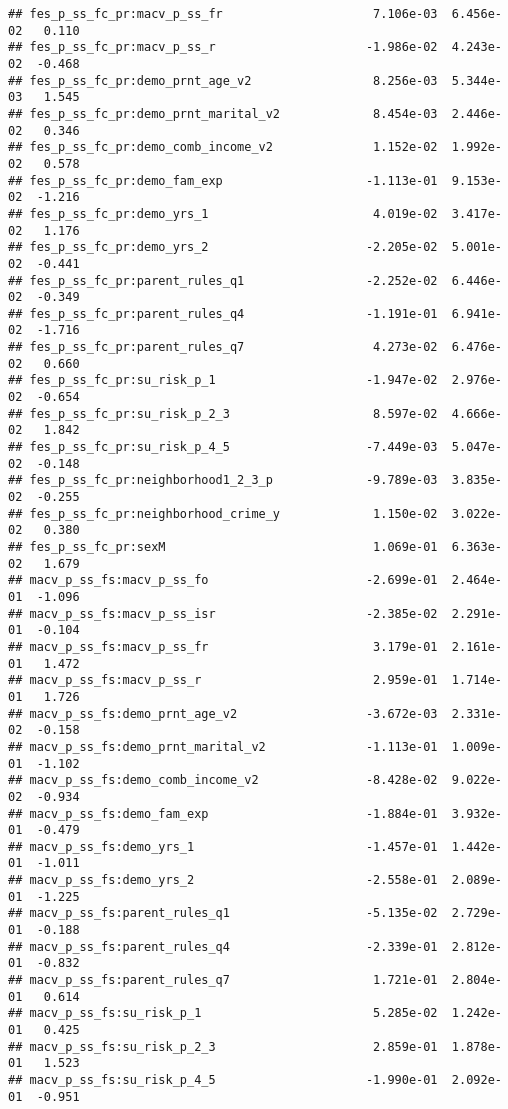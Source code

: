 \documentclass[
]{article}
\begin{document}
\begin{verbatim}
## fes_p_ss_fc_pr:macv_p_ss_fr                     7.106e-03  6.456e-02   0.110
## fes_p_ss_fc_pr:macv_p_ss_r                     -1.986e-02  4.243e-02  -0.468
## fes_p_ss_fc_pr:demo_prnt_age_v2                 8.256e-03  5.344e-03   1.545
## fes_p_ss_fc_pr:demo_prnt_marital_v2             8.454e-03  2.446e-02   0.346
## fes_p_ss_fc_pr:demo_comb_income_v2              1.152e-02  1.992e-02   0.578
## fes_p_ss_fc_pr:demo_fam_exp                    -1.113e-01  9.153e-02  -1.216
## fes_p_ss_fc_pr:demo_yrs_1                       4.019e-02  3.417e-02   1.176
## fes_p_ss_fc_pr:demo_yrs_2                      -2.205e-02  5.001e-02  -0.441
## fes_p_ss_fc_pr:parent_rules_q1                 -2.252e-02  6.446e-02  -0.349
## fes_p_ss_fc_pr:parent_rules_q4                 -1.191e-01  6.941e-02  -1.716
## fes_p_ss_fc_pr:parent_rules_q7                  4.273e-02  6.476e-02   0.660
## fes_p_ss_fc_pr:su_risk_p_1                     -1.947e-02  2.976e-02  -0.654
## fes_p_ss_fc_pr:su_risk_p_2_3                    8.597e-02  4.666e-02   1.842
## fes_p_ss_fc_pr:su_risk_p_4_5                   -7.449e-03  5.047e-02  -0.148
## fes_p_ss_fc_pr:neighborhood1_2_3_p             -9.789e-03  3.835e-02  -0.255
## fes_p_ss_fc_pr:neighborhood_crime_y             1.150e-02  3.022e-02   0.380
## fes_p_ss_fc_pr:sexM                             1.069e-01  6.363e-02   1.679
## macv_p_ss_fs:macv_p_ss_fo                      -2.699e-01  2.464e-01  -1.096
## macv_p_ss_fs:macv_p_ss_isr                     -2.385e-02  2.291e-01  -0.104
## macv_p_ss_fs:macv_p_ss_fr                       3.179e-01  2.161e-01   1.472
## macv_p_ss_fs:macv_p_ss_r                        2.959e-01  1.714e-01   1.726
## macv_p_ss_fs:demo_prnt_age_v2                  -3.672e-03  2.331e-02  -0.158
## macv_p_ss_fs:demo_prnt_marital_v2              -1.113e-01  1.009e-01  -1.102
## macv_p_ss_fs:demo_comb_income_v2               -8.428e-02  9.022e-02  -0.934
## macv_p_ss_fs:demo_fam_exp                      -1.884e-01  3.932e-01  -0.479
## macv_p_ss_fs:demo_yrs_1                        -1.457e-01  1.442e-01  -1.011
## macv_p_ss_fs:demo_yrs_2                        -2.558e-01  2.089e-01  -1.225
## macv_p_ss_fs:parent_rules_q1                   -5.135e-02  2.729e-01  -0.188
## macv_p_ss_fs:parent_rules_q4                   -2.339e-01  2.812e-01  -0.832
## macv_p_ss_fs:parent_rules_q7                    1.721e-01  2.804e-01   0.614
## macv_p_ss_fs:su_risk_p_1                        5.285e-02  1.242e-01   0.425
## macv_p_ss_fs:su_risk_p_2_3                      2.859e-01  1.878e-01   1.523
## macv_p_ss_fs:su_risk_p_4_5                     -1.990e-01  2.092e-01  -0.951

\end{verbatim}
\end{document}

